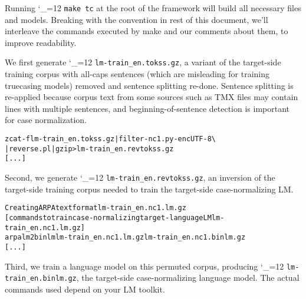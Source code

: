 \documentclass[11pt,letterpaper]{article}
\newcommand{\bs}{\textbackslash{}}
\def\code{\begingroup\catcode`\_=12 \codex}
\newcommand{\codex}[1]{\texttt{#1}\endgroup}
\begin{document}
Running \code{make tc} at the root of the framework will build all necessary
files and models.  Breaking with the convention in rest of this document, we'll
interleave the commands executed by make and our comments about them, to
improve readability.


We first generate \code{lm-train_en.tokss.gz}, a variant of the target-side
training corpus with all-caps sentences (which are misleading for training
truecasing models) removed and sentence splitting re-done.  Sentence splitting
is re-applied because corpus text from some sources such as TMX files may
contain lines with multiple sentences, and beginning-of-sentence detection is
important for case normalization.

\begin{small}
\begin{alltt}
   zcat -f lm-train_en.tokss.gz | filter-nc1.py -enc UTF-8 \bs
        | reverse.pl | gzip > lm-train_en.revtokss.gz
   [...]
\end{alltt}
\end{small}

Second, we generate \code{lm-train_en.revtokss.gz}, an inversion of the
target-side training corpus needed to train the target-side case-normalizing
LM.

\begin{small}
\begin{alltt}
   Creating ARPA text format lm-train_en.nc1.lm.gz
   [commands to train case-normalizing target-language LM lm-train_en.nc1.lm.gz]
   arpalm2binlm lm-train_en.nc1.lm.gz lm-train_en.nc1.binlm.gz
   [...]
\end{alltt}
\end{small}

Third, we train a language model on this permuted corpus, producing
\code{lm-train_en.binlm.gz}, the target-side case-normalizing language model.
The actual commands used depend on your LM toolkit.
\end{document}
